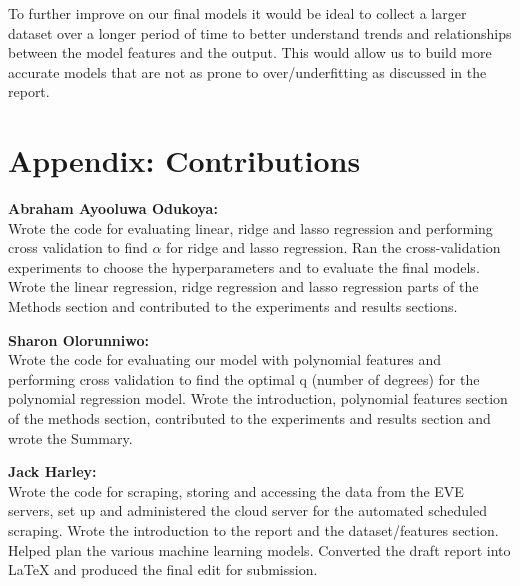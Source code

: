 \documentclass[10pt]{article}
\begin{document}
	To further improve on our final models it would be ideal to collect a larger dataset over a longer period of time to better understand trends and relationships between the model features and the output. This would allow us to build more accurate models that are not as prone to over/underfitting as discussed in the report.

\section{Appendix: Contributions}
	\textbf{Abraham Ayooluwa Odukoya:}\\
	Wrote the code for evaluating linear, ridge and lasso regression and performing cross validation to find $\alpha$ for ridge and lasso regression. Ran the cross-validation experiments to choose the hyperparameters and to evaluate the final models. Wrote the linear regression, ridge regression and lasso regression parts of the Methods section and contributed to the experiments and results sections.
	
	\textbf{Sharon Olorunniwo:}\\
	Wrote the code for evaluating our model with polynomial features and performing cross validation to find the optimal q (number of degrees) for the polynomial regression model. Wrote the introduction, polynomial features section of the methods section, contributed to the experiments and results section and wrote the Summary.
	
	\textbf{Jack Harley:}\\
	Wrote the code for scraping, storing and accessing the data from the EVE servers, set up and administered the cloud server for the automated scheduled scraping. Wrote the introduction to the report and the dataset/features section. Helped plan the various machine learning models. Converted the draft report into LaTeX and produced the final edit for submission.
		
\end{document}

